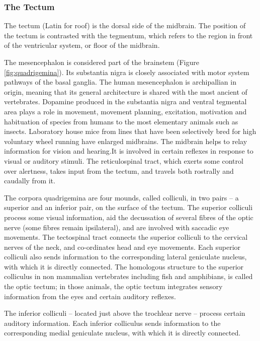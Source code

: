 \hypertarget{the-tectum}{%
\subsubsection{The Tectum}\label{the-tectum}}

The tectum (Latin for roof) is the dorsal side of the midbrain. The position of the tectum is contrasted with the tegmentum, which refers to the region in front of the ventricular system, or floor of the midbrain.

The mesencephalon is considered part of the brainstem (Figure \ref{fig:quadrigemina}). Its substantia nigra is closely associated with motor system pathways of the basal ganglia. The human mesencephalon is archipallian in origin, meaning that its general architecture is shared with the most ancient of vertebrates. Dopamine produced in the substantia nigra and ventral tegmental area plays a role in movement, movement planning, excitation, motivation and habituation of species from humans to the most elementary animals such as insects. Laboratory house mice from lines that have been selectively bred for high voluntary wheel running have enlarged midbrains. The midbrain helps to relay information for vision and hearing.It is involved in certain reflexes in response to visual or auditory stimuli. The reticulospinal tract, which exerts some control over alertness, takes input from the tectum, and travels both rostrally and caudally from it.

The corpora quadrigemina are four mounds, called colliculi, in two pairs -- a superior and an inferior pair, on the surface of the tectum. The superior colliculi process some visual information, aid the decussation of several fibres of the optic nerve (some fibres remain ipsilateral), and are involved with saccadic eye movements. The tectospinal tract connects the superior colliculi to the cervical nerves of the neck, and co-ordinates head and eye movements. Each superior colliculi also sends information to the corresponding lateral geniculate nucleus, with which it is directly connected. The homologous structure to the superior colliculus in non mammalian vertebrates including fish and amphibians, is called the optic tectum; in those animals, the optic tectum integrates sensory information from the eyes and certain auditory reflexes.

The inferior colliculi -- located just above the trochlear nerve -- process certain auditory information. Each inferior colliculus sends information to the corresponding medial geniculate nucleus, with which it is directly connected.

